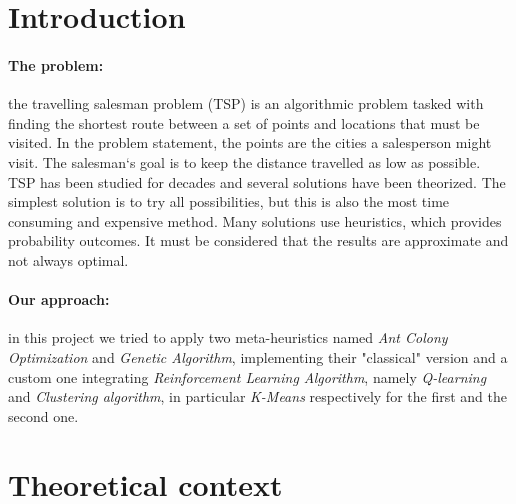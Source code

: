 \tableofcontents


\section{Introduction}
\paragraph{The problem:}
the travelling salesman problem (TSP) is an algorithmic problem tasked with finding the shortest route between a set of points and locations that must be visited. 
In the problem statement, the points are the cities a salesperson might visit. The salesman‘s goal is to keep the distance travelled as low as possible. 
TSP has been studied for decades and several solutions have been theorized. 
The simplest solution is to try all possibilities, but this is also the most time consuming and expensive method. 
Many solutions use heuristics, which provides probability outcomes. 
It must be considered that the results are approximate and not always optimal. 
\paragraph{Our approach:}
in this project we tried to apply two meta-heuristics named \textit{Ant Colony Optimization} and \textit{Genetic Algorithm}, implementing their "classical" version and a custom one integrating \textit{Reinforcement Learning Algorithm}, namely \textit{Q-learning} and \textit{Clustering algorithm}, in particular \textit{K-Means} respectively for the first and the second one.

\section{Theoretical context}
